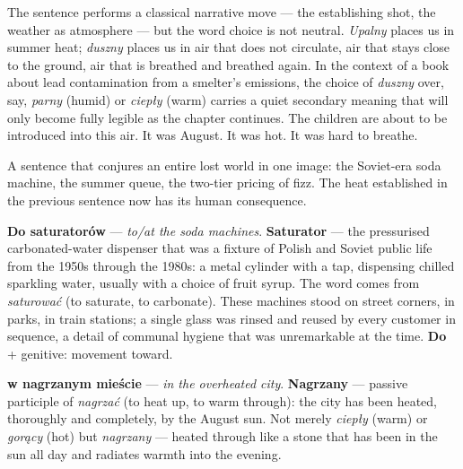 \medskip
The sentence performs a classical narrative move ---
the establishing shot, the weather as atmosphere ---
but the word choice is not neutral. \textit{Upalny}
places us in summer heat; \textit{duszny} places us
in air that does not circulate, air that stays close
to the ground, air that is breathed and breathed again.
In the context of a book about lead contamination from
a smelter's emissions, the choice of \textit{duszny}
over, say, \textit{parny} (humid) or \textit{ciepły}
(warm) carries a quiet secondary meaning that will
only become fully legible as the chapter continues.
The children are about to be introduced into this air.
It was August. It was hot. It was hard to breathe.



A sentence that conjures an entire lost world in one image:
the Soviet-era soda machine, the summer queue, the two-tier
pricing of fizz. The heat established in the previous
sentence now has its human consequence.

\textbf{Do saturatorów} --- \textit{to/at the soda machines}.
\textbf{Saturator} --- the pressurised carbonated-water
dispenser that was a fixture of Polish and Soviet public
life from the 1950s through the 1980s: a metal cylinder
with a tap, dispensing chilled sparkling water, usually
with a choice of fruit syrup. The word comes from
\textit{saturować} (to saturate, to carbonate). These
machines stood on street corners, in parks, in train
stations; a single glass was rinsed and reused by every
customer in sequence, a detail of communal hygiene that
was unremarkable at the time. \textbf{Do} + genitive:
movement toward.

\textbf{w nagrzanym mieście} --- \textit{in the
overheated city}. \textbf{Nagrzany} --- passive
participle of \textit{nagrzać} (to heat up, to warm
through): the city has been heated, thoroughly and
completely, by the August sun. Not merely \textit{ciepły}
(warm) or \textit{gorący} (hot) but \textit{nagrzany}
--- heated through like a stone that has been in the
sun all day and radiates warmth into the evening.

